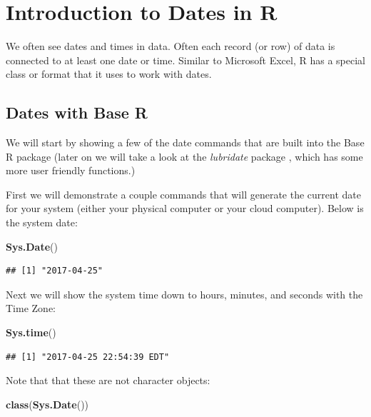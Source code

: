 \documentclass[]{book}
\newenvironment{Shaded}{\begin{snugshade}}{\end{snugshade}}
\newcommand{\KeywordTok}[1]{\textcolor[rgb]{0.13,0.29,0.53}{\textbf{{#1}}}}
\newcommand{\NormalTok}[1]{{#1}}
\begin{document}
\chapter{Introduction to Dates in R}\label{introduction-to-dates-in-r}

We often see dates and times in data. Often each record (or row) of data
is connected to at least one date or time. Similar to Microsoft Excel, R
has a special class or format that it uses to work with dates.

\section{Dates with Base R}\label{dates-with-base-r}

We will start by showing a few of the date commands that are built into
the Base R package (later on we will take a look at the \emph{lubridate}
package \citep{R-lubridate}, which has some more user friendly
functions.)

First we will demonstrate a couple commands that will generate the
current date for your system (either your physical computer or your
cloud computer). Below is the system date:

\begin{Shaded}
\begin{Highlighting}[]
\KeywordTok{Sys.Date}\NormalTok{()}
\end{Highlighting}
\end{Shaded}

\begin{verbatim}
## [1] "2017-04-25"
\end{verbatim}

Next we will show the system time down to hours, minutes, and seconds
with the Time Zone:

\begin{Shaded}
\begin{Highlighting}[]
\KeywordTok{Sys.time}\NormalTok{()}
\end{Highlighting}
\end{Shaded}

\begin{verbatim}
## [1] "2017-04-25 22:54:39 EDT"
\end{verbatim}

Note that that these are not character objects:

\begin{Shaded}
\begin{Highlighting}[]
\KeywordTok{class}\NormalTok{(}\KeywordTok{Sys.Date}\NormalTok{())}
\end{Highlighting}
\end{Shaded}
\end{document}
